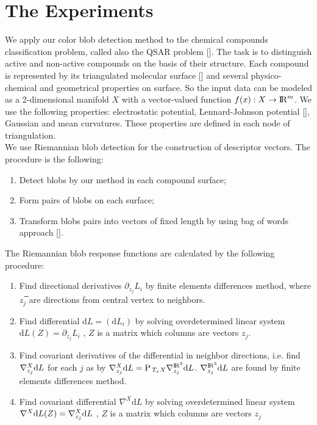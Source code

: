 \documentclass{llncs}
\newcommand{\Proj}{\mathrm{P}{\,}}
\newcommand{\partderiv}[2]{\partial_{#2} {#1}}
\newcommand{\CovariantDiffManif}[1]{\nabla^{#1}}
\newcommand{\CovariantDerivManif}[2]{\tensor*{\nabla}{^{#1}_{#2}}}
\newcommand{\Diff}{\mathrm{d}}
\begin{document}
\section{The Experiments}
We apply our color blob detection method to the chemical compounds classification problem, called also the QSAR problem []. The task is to distinguish active and non-active compounds on the basis of their structure. Each compound is represented by its triangulated molecular surface [] and several physico-chemical and geometrical properties on surface. So the input data can be modeled as a 2-dimensional manifold $X$ with a vector-valued function $f(x):X \to {\rm I\!R}^m$. We use the following properties: electrostatic potential, Lennard-Johnson potential [], Gaussian and mean curvatures. These properties are defined in each node of triangulation.
\\
We use Riemannian blob detection for the construction of descriptor vectors. The procedure is the following:
\begin{enumerate} 
\item Detect blobs by our method in each compound surface;
\item	Form pairs of blobs on each surface;
\item Transform blobs pairs into vectors of fixed length by using bag of words approach [].
\end{enumerate}
The Riemannian blob response functions are calculated by the following procedure:
\begin{enumerate} 
	\item Find directional derivatives $\partderiv{L_i}{z_j}$ by finite elements differences method, where $z_j$̅ are directions from central vertex to neighbors. 
	\item Find differential $\Diff L=(\Diff L_i)$ by solving overdetermined linear system $\Diff L(Z)=\partderiv{L_i}{z_j}$ , $Z$  is a matrix which columns are vectors $z_j$.
	\item Find covariant derivatives of the differential in neighbor directions, i.e. find $\CovariantDerivManif{X}{z_j} \Diff L$ for each $j$ as by $\CovariantDerivManif{X}{z_j} \Diff L =\Proj_{T_xX} \CovariantDerivManif{\bbbr^3}{z_j} \Diff L$. $\CovariantDerivManif{\bbbr^3}{z_j} \Diff L$ are found by finite elements differences method.
	\item Find covariant differential $\CovariantDiffManif{X} \Diff L$ by solving overdetermined linear system 
	$\CovariantDiffManif{X} \Diff L(Z)=\CovariantDerivManif{X}{z_j} \Diff L$ , $Z$  is a matrix which columns are vectors $z_j$
	\end{enumerate}
\end{document}
